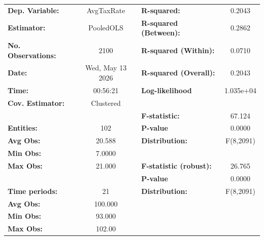 \begin{center}
\begin{tabular}{lclc}
\toprule
\textbf{Dep. Variable:}                       &     AvgTaxRate     & \textbf{  R-squared:         }   &      0.2043      \\
\textbf{Estimator:}                           &     PooledOLS      & \textbf{  R-squared (Between):}  &      0.2862      \\
\textbf{No. Observations:}                    &        2100        & \textbf{  R-squared (Within):}   &      0.0710      \\
\textbf{Date:}                                &  Wed, May 13 2026  & \textbf{  R-squared (Overall):}  &      0.2043      \\
\textbf{Time:}                                &      00:56:21      & \textbf{  Log-likelihood     }   &    1.035e+04     \\
\textbf{Cov. Estimator:}                      &     Clustered      & \textbf{                     }   &                  \\
\textbf{}                                     &                    & \textbf{  F-statistic:       }   &      67.124      \\
\textbf{Entities:}                            &        102         & \textbf{  P-value            }   &      0.0000      \\
\textbf{Avg Obs:}                             &       20.588       & \textbf{  Distribution:      }   &    F(8,2091)     \\
\textbf{Min Obs:}                             &       7.0000       & \textbf{                     }   &                  \\
\textbf{Max Obs:}                             &       21.000       & \textbf{  F-statistic (robust):} &      26.765      \\
\textbf{}                                     &                    & \textbf{  P-value            }   &      0.0000      \\
\textbf{Time periods:}                        &         21         & \textbf{  Distribution:      }   &    F(8,2091)     \\
\textbf{Avg Obs:}                             &      100.000       & \textbf{                     }   &                  \\
\textbf{Min Obs:}                             &       93.000       & \textbf{                     }   &                  \\
\textbf{Max Obs:}                             &       102.00       & \textbf{                     }   &                  \\

\end{tabular}
\end{center}

